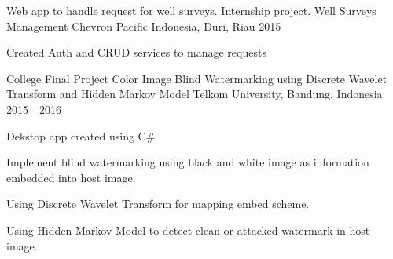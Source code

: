 \begin{cventries}
\cventry
    {Web app to handle request for well surveys. Internship project.}
    {Well Surveys Management}
    {Chevron Pacific Indonesia, Duri, Riau}
    {2015}
    {
        \begin{cvitems}
            \item {Created Auth and CRUD services to manage requests}
        \end{cvitems}
    }

    
\cventry
    {College Final Project}
    {Color Image Blind Watermarking using Discrete Wavelet Transform and Hidden Markov Model}
    {Telkom University, Bandung, Indonesia}
    {2015 - 2016}
    {
        \begin{cvitems}
            \item {Dekstop app created using C\#}
            \item {Implement blind watermarking using black and white image as information embedded into host image.}
            \item {Using Discrete Wavelet Transform for mapping embed scheme.}
            \item {Using Hidden Markov Model to detect clean or attacked watermark in host image.}
        \end{cvitems}
    }

\iffalse
\cventry
    {A Project while working in Emporia. Web app to subscribe to Alibaba GGS}
    {Eksporaja.com}
    {Emporia Digital, Serpong, Indonesia}
    {Nov 2016 - Mar 2017}
    {
        \begin{cvitems}
            \item {Web app created using Java, MySQL, Hibernate, and Tomcat for backend. HTML/CSS, Javascript, JSP for frontend}
            \item {Provide subscription to Alibaba GGS for SMEs in Indonesia.}
            \item {Provide payment gateway for Alibaba GGS Subscription using Doku.}
        \end{cvitems}
    }

\cventry
    {A Project while working in Emporia. B2C mobile app}
    {Infodaily}
    {Emporia Digital, Serpong, Indonesia}
    {Mar 2017 - February 2018}
    {
        \begin{cvitems}
            \item {A mobile app to provide B2C services(food, mart, billing payment) and places directory.}
            \item {Web services in form of REST APIs, Push notif, mail services, payment gateway, and authentication using PHP and AJAX .}
            \item {Back office created using wordpress.}
            \item {Mobile app created using Android and iOS}
        \end{cvitems}
    }
\fi
\end{cventries}
